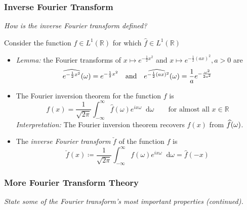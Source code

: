 \documentclass[11pt, a4paper]{article}
\newcommand{\question}[1]{\textit{#1}\vspace{2mm}}
\newcommand{\R}{\mathbb{R}} %
\newcommand{\diff}{\mathop{}\!\mathrm{d}} %
\begin{document}
\subsubsection{Inverse Fourier Transform}
\question{How is the inverse Fourier transform defined? }

Consider the function  $ f \in L^{1}(\R) $ for which $ \widehat{f}  \in L^{1}(\R) $
\begin{itemize}
	\item \textit{Lemma:} the Fourier transforms of $ x \mapsto e^{-\frac{1}{2}x^2} $ and $ x \mapsto e^{-\frac{1}{2}(ax)^2}, a > 0 $ are
	\begin{equation*}
		\F{e^{-\frac{1}{2}x^2}}{\omega}
		= e^{-\frac{1}{2}x^2} \quad \text{and} \quad \F{e^{-\frac{1}{2}(ax)^2}}{\omega} = \frac{1}{a} e^{-\frac{\omega^2}{2a^2}}
	\end{equation*}
	
	\item The Fourier inversion theorem for the function $ f $ is
	\begin{equation*}
		f(x) = \frac{1}{\sqrt{2\pi}} \int_{-\infty}^{\infty} \widehat{f}(\omega) e^{ix \omega} \diff \omega \qquad \text{for almost all } x \in \R
	\end{equation*}
	\textit{Interpretation:} The Fourier inversion theorem recovers $ f(x) $ from $ \F{f}{\omega} $.
	
	\item The \textit{inverse Fourier transform} $ \check{f} $ of the function $ f $ is
	\begin{equation*}
		\check{f}(x) \coloneqq \frac{1}{\sqrt{2\pi}} \int_{-\infty}^{\infty} f(\omega) e^{i x \omega} \diff \omega = \widehat{f}(-x)
	\end{equation*}
	
\end{itemize}

\subsubsection{More Fourier Transform Theory}
\question{State some of the Fourier transform's most important properties (continued).}
\end{document}
